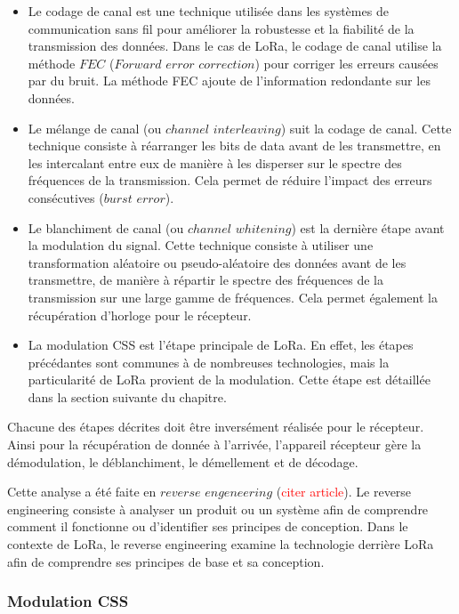 \begin{itemize}
\item Le codage de canal est une technique utilisée dans les systèmes de communication sans fil pour améliorer la robustesse et la fiabilité de la transmission des données. Dans le cas de LoRa, le codage de canal utilise la méthode $FEC$ ($Forward$ $error$ $correction$) pour corriger les erreurs causées par du bruit. La méthode FEC ajoute de l'information redondante sur les données.
\item Le mélange de canal (ou $channel$ $interleaving$) suit la codage de canal.  
Cette technique consiste à réarranger les bits de data avant de les transmettre, en les intercalant entre eux de manière à les disperser sur le spectre des fréquences de la transmission. Cela permet de réduire l'impact des erreurs consécutives ($burst$ $error$).
\item Le blanchiment de canal (ou $channel$ $whitening$) est la dernière étape avant la modulation du signal.
Cette technique consiste à utiliser une transformation aléatoire ou pseudo-aléatoire des données avant de les transmettre, de manière à répartir le spectre des fréquences de la transmission sur une large gamme de fréquences. Cela permet également la récupération d'horloge pour le récepteur.
\item La modulation CSS est l'étape principale de LoRa. En effet, les étapes précédantes sont communes à de nombreuses technologies, mais la particularité de LoRa provient de la modulation. Cette étape est détaillée dans la section suivante du chapitre.
\end{itemize}

\vspace{0.1cm}

Chacune des étapes décrites doit être inversément réalisée pour le récepteur. Ainsi pour la récupération de donnée à l'arrivée, l'appareil récepteur gère la démodulation, le déblanchiment, le démellement et de décodage.

\vspace{0.1cm}

Cette analyse a été faite en $reverse$ $engeneering$ (\textcolor{red}{citer article}). Le reverse engineering consiste à analyser un produit ou un système afin de comprendre comment il fonctionne ou d'identifier ses principes de conception. Dans le contexte de LoRa, le reverse engineering examine la technologie derrière LoRa afin de comprendre ses principes de base et sa conception.


\subsubsection{Modulation CSS}

